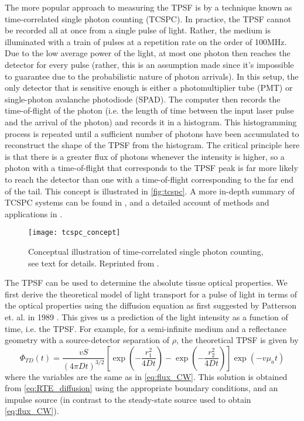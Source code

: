 The more popular approach to measuring the TPSF is by a technique known as time-correlated single photon counting (TCSPC). In practice, the TPSF cannot be recorded all at once from a single pulse of light. Rather, the medium is illuminated with a train of pulses at a repetition rate on the order of 100MHz. Due to the low average power of the light, at most one photon then reaches the detector for every pulse (rather, this is an assumption made since it's impossible to guarantee due to the probabilistic nature of photon arrivals). In this setup, the only detector that is sensitive enough is either a photomultiplier tube (PMT) or single-photon avalanche photodiode (SPAD). The computer then records the time-of-flight of the photon (i.e. the length of time between the input laser pulse and the arrival of the photon) and records it in a histogram. This histogramming process is repeated until a sufficient number of photons have been accumulated to reconstruct the shape of the TPSF from the histogram. The critical principle here is that there is a greater flux of photons whenever the intensity is higher, so a photon with a time-of-flight that corresponds to the TPSF peak is far more likely to reach the detector than one with a time-of-flight corresponding to the far end of the tail. This concept is illustrated in \autoref{fig:tcspc}. A more in-depth summary of TCSPC systems can be found in \cite{Wahl2014}, and a detailed account of methods and applications in \cite{Becker2005, Becker2014}.

\begin{figure}[tb]
    \centering
    \texttt{[image: tcspc\_concept]}
    \caption{Conceptual illustration of time-correlated single photon counting, see text for details. Reprinted from \cite{Becker2014}.}
    \label{fig:tcspc}
\end{figure}

The TPSF can be used to determine the absolute tissue optical properties. We first derive the theoretical model of light transport for a pulse of light in terms of the optical properties using the diffusion equation as first suggested by Patterson et. al. in 1989 \cite{Patterson1989}. This gives us a prediction of the light intensity as a function of time, i.e. the TPSF. For example, for a semi-infinite medium and a reflectance geometry with a source-detector separation of $\rho$, the theoretical TPSF is given by \cite{Kienle1997} 
\begin{equation} \label{eq:TPSF}
\Phi_{TD}(t) = \frac{vS}{(4\pi D t)^{3/2}} 
\left[ 
\exp( -\frac{r_1^2} {4Dt} )
-\exp( -\frac{r_2^2} {4Dt} ) 
\right]
\exp(-v\mu_a t)
\end{equation}
where the variables are the same as in \autoref{eq:flux_CW}. This solution is obtained from \autoref{eq:RTE_diffusion} using the appropriate boundary conditions, and an impulse source (in contrast to the steady-state source used to obtain \autoref{eq:flux_CW}). 


